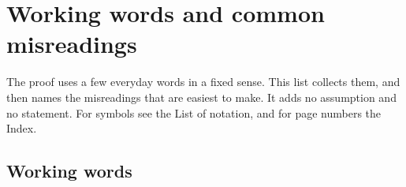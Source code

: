\chapter*{Working words and common misreadings}
\label{S:glossary}

The proof uses a few everyday words in a fixed sense. This list collects them,
and then names the misreadings that are easiest to make. It adds no assumption
and no statement. For symbols see the List of notation, and for page numbers
the Index.

\section*{Working words}

